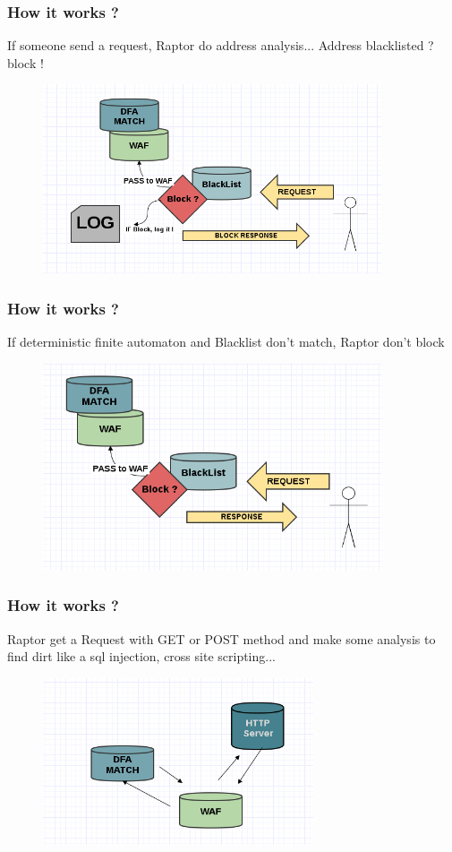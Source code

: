 \documentclass[serif,mathserif]{beamer}
\begin{document}
\begin{frame}
  \frametitle{How it works ?}
  If someone send a request, Raptor do address analysis... Address blacklisted ? block !
  \begin{itemize} 
  \begin{figure}[]    
    \centering
    \includegraphics[width=10cm]{images/blockip.png} 
  \end{figure}
  \end{itemize}
\end{frame}

\begin{frame}
  \frametitle{How it works ?}
  If deterministic finite automaton and Blacklist don't match, Raptor don't block 
  \begin{itemize} 
  \begin{figure}[]    
    \centering
    \includegraphics[width=10cm]{images/pass.png} 
  \end{figure}
  \end{itemize}
\end{frame}

\begin{frame}
  \frametitle{How it works ?}
  Raptor get a Request with GET or POST method and make some analysis to find dirt like a sql injection, cross site scripting...
  \begin{itemize} 
  \begin{figure}[]    
    \centering
    \includegraphics[width=8cm]{images/http.png} 
  \end{figure}
  \end{itemize}
\end{frame}
\end{document}
